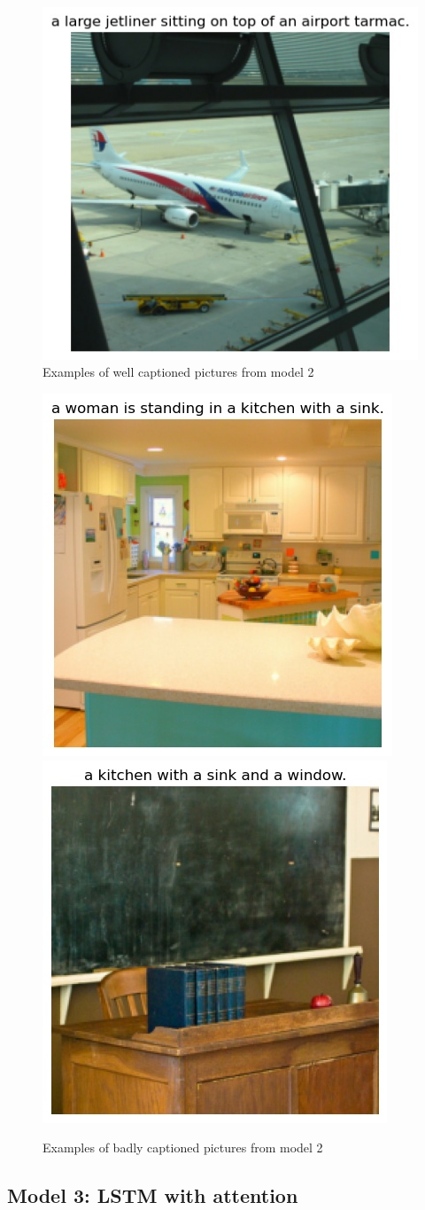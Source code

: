\begin{figure}[H]
    \includegraphics[width=0.45\linewidth]{Images/477441.jpg}
    \caption{Examples of well captioned pictures from model 2}
    \label{fig:captioned_images}
\end{figure}

\begin{figure}[H]
    \centering
    \includegraphics[width=0.45\linewidth]{Images/540502.jpg}
    \includegraphics[width=0.45\linewidth]{Images/17182.jpg}
    \caption{Examples of badly captioned pictures from model 2}
    \label{fig:bad_captioned_images}
\end{figure}

\subsection*{Model 3: LSTM with attention}

